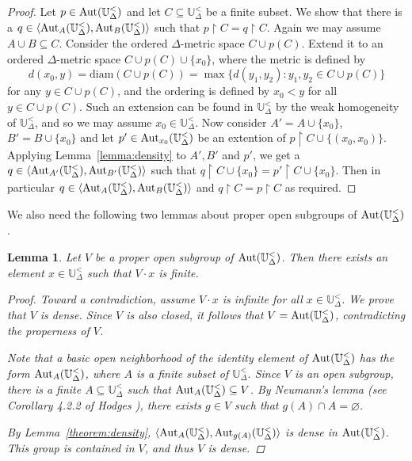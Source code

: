 \documentclass[10pt,a4paper]{amsart}
\newtheorem{lemma}[theorem]{Lemma}
\theoremstyle{definition}
\theoremstyle{remark}
\begin{document}
\begin{proof}   Let $p \in {\rm Aut}(\mathbb{U}_{\Delta}^<)$ and let $C \subseteq \mathbb{U}_{\Delta}^<$ be a finite subset. We show that there is a $q \in \langle {\rm Aut}_A(\mathbb{U}_{\Delta}^<), {\rm Aut}_B(\mathbb{U}_{\Delta}^<) \rangle$ such that $p\upharpoonright C=q\upharpoonright C$. Again we may assume $A\cup B \subseteq C$. Consider the ordered $\Delta$-metric space $C \cup p(C)$. Extend it to an ordered $\Delta$-metric space $C \cup p(C) \cup \{x_0\}$, where the metric is defined by 
$$d(x_0,y)=\mbox{diam}(C\cup p(C))=\max\{d(y_1,y_2)\colon y_1,y_2 \in C \cup p(C)\}$$
for any $y\in C\cup p(C)$, and the ordering is defined by $x_0 <y$ for all $y\in C\cup p(C)$.
           Such an extension can be found in $\mathbb{U}_{\Delta}^<$ by the weak homogeneity of $\mathbb{U}^<_\Delta$, and so we may assume $x_0 \in \mathbb{U}_{\Delta}^<$. Now consider $A' = A \cup \{x_0\}$, $B' = B \cup \{x_0\}$ and let $p' \in {\rm Aut}_{x_0}(\mathbb{U}_\Delta^<)$ be an extention of $p\upharpoonright C \cup \{(x_0,x_0)\}$. Applying Lemma~\ref{lemma:density} to $A', B'$ and $p'$, we get a $q \in \langle {\rm Aut}_{A'}(\mathbb{U}_{\Delta}^<), {\rm Aut}_{B'}(\mathbb{U}_{\Delta}^<) \rangle$ such that $q\upharpoonright C\cup\{x_0\}=p'\upharpoonright C\cup\{x_0\}$. Then in particular $q \in \langle {\rm Aut}_A(\mathbb{U}_{\Delta}^<), {\rm Aut}_B(\mathbb{U}_{\Delta}^<) \rangle$ and $q\upharpoonright C=p\upharpoonright C$ as required. 
        \end{proof}
 
We also need the following two lemmas about proper open subgroups of $\mbox{\rm Aut}(\mathbb{U}^<_\Delta)$.    

     \begin{lemma}\label{lemma:f_orbit}
        Let $V$ be a proper open subgroup of ${\rm Aut}(\mathbb{U}_{\Delta}^<)$. Then there exists an element $x \in \mathbb{U}_{\Delta}^<$ such that $V\cdot x$ is finite.
        \begin{proof}
           Toward a contradiction, assume $V\cdot x$ is infinite for all $x\in \mathbb{U}_{\Delta}^<$. We prove that $V$ is dense. Since $V$ is also closed, it follows that $V = {\rm Aut}(\mathbb{U}_{\Delta}^<)$, contradicting the properness of $V$. 

Note that a basic open neighborhood of the identity element of $\mbox{\rm Aut}(\mathbb{U}^<_\Delta)$ has the form ${\rm Aut}_{A}(\mathbb{U}_{\Delta}^<)$, where $A$ is a finite subset of $\mathbb{U}^<_\Delta$. Since $V$ is an open subgroup, there is a finite $A\subseteq \mathbb{U}^<_\Delta$ such that ${\rm Aut}_{A}(\mathbb{U}_{\Delta}^<) \subseteq V$. By Neumann's lemma (see Corollary 4.2.2 of Hodges \cite{Hodges}), there exists $g \in V$ such that $g(A)\cap A = \varnothing$. 
           
By Lemma~\ref{theorem:density}, $\langle {\rm Aut}_{A}(\mathbb{U}_{\Delta}^<), {\rm Aut}_{g(A)}(\mathbb{U}_{\Delta}^<) \rangle$ is dense in ${\rm Aut}(\mathbb{U}_{\Delta}^<)$. This group is contained in $V$, and thus $V$ is dense. 
        \end{proof}
     \end{lemma}
\end{document}
